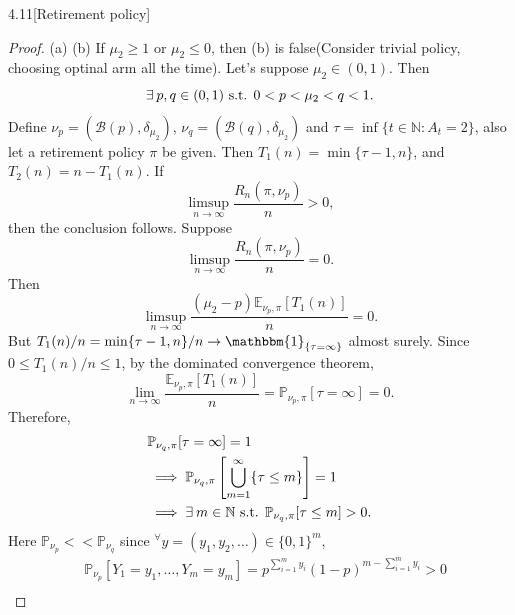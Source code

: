 \documentclass[10pt]{article}
\theoremstyle{definition}
\newenvironment{exercise*}[1]{%
  \IfBlankTF{#1}
    {\renewcommand{\themanualexerciseinner}{\unskip}}
    {\renewcommand\themanualexerciseinner{#1}}%
  \manualexerciseinner
}{\endmanualexerciseinner}
\begin{document}
\begin{exercise*}{4.11}[Retirement policy]
\begin{proof}{(a)}
        (b)
        If $\mu_2 \geq 1 \text{ or } \mu_2 \leq 0$, then (b) is false(Consider trivial policy, choosing optinal arm all the time).
        Let's suppose $\mu_2 \in (0,1)$.
        Then 
        \begin{equation*}
            \exists \hspace{0.2em} p,q \in (0,1) \text{ s.t. } 0 < p < \mu_2 < q < 1.
        \end{equation*}
        Define $\nu_p = (\mathcal{B}(p), \delta_{\mu_2})$, $\nu_q = (\mathcal{B}(q), \delta_{\mu_2})$ and $\tau = \inf\{t \in \mathbb{N} : A_t = 2\}$, also let a retirement policy $\pi$ be given.
        Then $T_1 (n) = \min\{\tau - 1, n\}$, and $T_2(n) = n - T_1(n)$.
        If
        \begin{equation*}
            \limsup_{n \to \infty} \frac{R_n (\pi, \nu_p)}{n} > 0,
        \end{equation*}
        then the conclusion follows.
        Suppose 
        \begin{equation*}
            \limsup_{n \to \infty} \frac{R_n (\pi, \nu_p)}{n} = 0.
        \end{equation*}
        Then 
        \begin{equation*}
            \limsup_{n \to \infty} \frac{(\mu_2 - p)\mathbb{E}_{\nu_p, \pi}[T_1(n)]}{n} = 0.
        \end{equation*}
        But $T_1(n)/n = \min\{\tau - 1, n\}/n \to \mathbbm{1}_{\{\tau = \infty \}}$ almost surely.
        Since $0 \leq T_1(n)/n \leq 1$, by the dominated convergence theorem,
        \begin{equation*}
            \lim_{n \rightarrow \infty} \frac{\mathbb{E}_{\nu_p, \pi}[T_1(n)]}{n} = \mathbb{P}_{\nu_p, \pi}[\tau = \infty] = 0.
        \end{equation*}
        Therefore, 
        \begin{align*}
            &\mathbb{P}_{\nu_q, \pi}[\tau = \infty] = 1 \\
            &\implies \mathbb{P}_{\nu_q, \pi}\left[\bigcup_{m=1}^\infty \{\tau \leq m \}\right] = 1 \\
            &\implies \exists \hspace{0.2em} m \in \mathbb{N} \text{ s.t. } \mathbb{P}_{\nu_q, \pi}[\tau \leq m] > 0.
        \end{align*}
        Here $\mathbb{P}_{\nu_p} << \mathbb{P}_{\nu_q}$ since $^\forall y = (y_1, y_2, \ldots) \in \{0,1\}^m$,
        \begin{align*}
            &\mathbb{P}_{\nu_p}[Y_1 = y_1, \ldots, Y_m = y_m] = p^{\sum_{i=1}^m y_i} (1-p)^{m - \sum_{i=1}^m y_i} > 0 \\

\end{align*}
\end{proof}
\end{exercise*}
\end{document}
